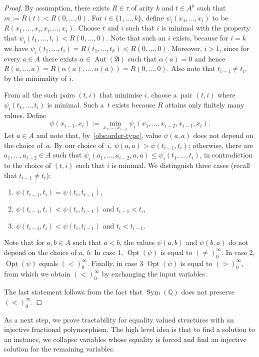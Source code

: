 \documentclass[preprint,12pt]{elsarticle}
\newcommand{\Q}{\mathbb Q}
\newcommand{\bA}{{\mathfrak A}}
\newcommand{\checked}[1]{#1}
\DeclareMathOperator{\Aut}{Aut}
\DeclareMathOperator{\Opt}{Opt}
\DeclareMathOperator{\Sym}{Sym}
\begin{document}
\begin{proof}
By assumption, there exists $R \in \tau$ of arity $k$ and $t \in A^k$ 
such that $m := R(t) < R(0,\dots,0)$. 
For $i \in \{1,\dots,k\}$, define $\psi_i(x_1, \dots, x_i)$ to be $R(x_1,\dots,x_i,x_i,\dots,x_i)$. 
Choose $t$ and $i$ such that $i$ is minimal with the property that $\psi_i(t_1,\dots,t_i) < R(0,\dots,0)$. 
Note that such an $i$ exists, because for $i = k$ we have 
$\psi_i(t_1,\dots,t_i) = R(t_1,\dots,t_k) < R(0,\dots,0)$. Moreover, $i>1$, since for every $a \in A$ there exists $\alpha \in \Aut(\bA)$ such that $\alpha(a)=0$ and hence $R(a, \ldots, a)=R(\alpha(a), \ldots, \alpha(a))=R(0, \ldots, 0)$. 
Also note that $t_{i-1} \neq t_i$, by the minimality of $i$. 

From all the such pairs $(t,i)$ that minimise $i$, choose a~pair 
$(t,i)$ where $\psi_i(t_1,\dots,t_i)$ is minimal. Such a~$t$ exists because $R$ attains only finitely many values. 
Define \[\psi(x_{i-1},x_i) := \min_{x_1,\dots,x_{i-2}} \psi_i(x_1,\dots, x_{i-2}, x_{i-1}, x_i).\]
Let $a\in A$ and note that, by~\cref{obs:order-type}, value $\psi(a,a)$ does not depend on the choice of~$a$. By our choice of~$i$, $\psi(a,a) > \psi(t_{i-1},t_i)$; otherwise, there are $a_1,\dots,a_{i-2} \in A$ such that 
$\psi_i(a_1,\dots,a_{i-2},a,a) \leq \psi_i(t_1, \dots, t_i)$, in contradiction to the choice of $(t,i)$ such that $i$ is minimal. 
We distinguish three cases (recall that $t_{i-1} \neq t_i$):
\begin{enumerate}
\item $\psi(t_{i-1}, t_i)=\psi(t_i,t_{i-1})$,
\item $\psi(t_{i-1}, t_i)<\psi(t_i,t_{i-1})$ and $t_{i-1}<t_i$,
\item $\psi(t_{i-1}, t_i)<\psi(t_i,t_{i-1})$ and $t_i < t_{i-1}$.
\end{enumerate}
Note that for $a,b \in A$ such that $a<b$, the values $\psi(a,b)$ and $\psi(b,a)$ do not depend on the choice of $a$, $b$.
In case 1, $\Opt(\psi)$ \checked{is equal to} $(\neq)_0^\infty$. In case 2, $\Opt(\psi)$ \checked{equals} $(<)_0^\infty$. Finally, in case 3 $\Opt(\psi)$ \checked{is equal to} $(>)_0^\infty$, \checked{from which we obtain} $(<)_0^\infty$ by exchanging the input variables.

The last statement follows from the fact that $\Sym(\Q)$ does not preserve $(<)_0^\infty$. 
\end{proof}

\checked{As a next step, we prove tractability for equality valued structures with an injective fractional polymorphism. The high level idea is that to find a solution to an instance, we collapse variables whose equality is forced and find an injective solution for the remaining variables.}
\end{document}

